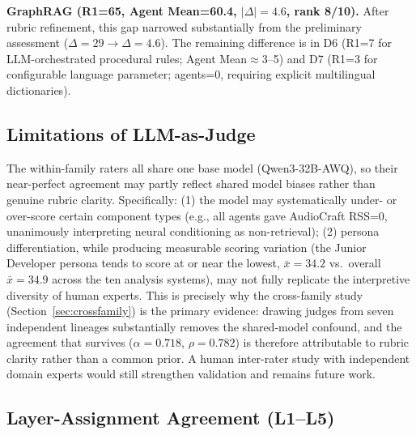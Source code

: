 \documentclass[10pt,a4paper]{article}
\begin{document}
\textbf{GraphRAG (R1=65, Agent Mean=60.4, $|\Delta|=4.6$, rank 8/10).} After rubric refinement, this gap narrowed substantially from the preliminary assessment ($\Delta=29 \to \Delta=4.6$). The remaining difference is in D6 (R1=7 for LLM-orchestrated procedural rules; Agent Mean$\approx$3--5) and D7 (R1=3 for configurable language parameter; agents=0, requiring explicit multilingual dictionaries).

\subsection{Limitations of LLM-as-Judge}

The within-family raters all share one base model (Qwen3-32B-AWQ), so their near-perfect agreement may partly reflect shared model biases rather than genuine rubric clarity. Specifically: (1) the model may systematically under- or over-score certain component types (e.g., all agents gave AudioCraft RSS=0, unanimously interpreting neural conditioning as non-retrieval); (2) persona differentiation, while producing measurable scoring variation (the Junior Developer persona tends to score at or near the lowest, $\bar{x}=34.2$ vs.\ overall $\bar{x}=34.9$ across the ten analysis systems), may not fully replicate the interpretive diversity of human experts. This is precisely why the cross-family study (Section~\ref{sec:crossfamily}) is the primary evidence: drawing judges from seven independent lineages substantially removes the shared-model confound, and the agreement that survives ($\alpha=0.718$, $\rho=0.782$) is therefore attributable to rubric clarity rather than a common prior. A human inter-rater study with independent domain experts would still strengthen validation and remains future work.

\subsection{Layer-Assignment Agreement (L1--L5)}
\label{sec:layer_agreement}
\end{document}
